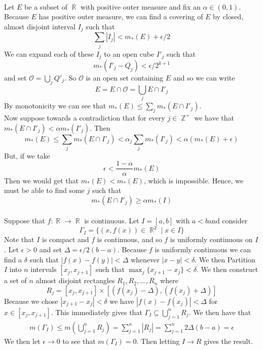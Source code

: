 \documentclass{article}
\DeclareMathOperator{\Z}{\mathbb{Z}}
\DeclareMathOperator{\R}{\mathbb{R}}
\DeclareMathOperator{\suchthat}{\mathrel{|}}
\newcommand{\problem}[1]{\noindent{\textbf{Problem #1}}\\}
\begin{document}
\problem{1.6.28} Let $E$ be a subset of $\R$ with positive outer measure and fix an $\alpha \in (0,1)$. Because $E$ has positive outer measure, we can find a covering of $E$ by closed, almost disjoint interval $I_j$ such that 
\[
\sum_j |I_j| < m_*(E) + \epsilon/2
\]
We can expand each of these $I_j$ to an open cube $I'_j$ such that 
\[
m_*(I'_j - Q_j) < \epsilon/2^{k+1}
\]
and set $\mathcal{O} = \bigcup_j Q'_j$. So $\mathcal{O}$ is an open set containing $E$ and so we can write
\[
E = E \cap \mathcal{O} = \bigcup_j E \cap I'_j 
\] 
By monotonicity we can see that $m_*(E) \leq \sum_j m_*(E\cap I'_j)$. \\
\indent Now suppose towards a contradiction that for every $j \in \Z^+$ we have that $m_*(E \cap I'_j) < \alpha m_*(I'_j)$. Then
\[
m_*(E) \leq \sum_jm_*(E\cap I'_j) < \alpha_j\sum_j m_*(I'_j) < \alpha(m_*(E) + \epsilon)
\] 
But, if we take 
\[
\epsilon < \frac{1-\alpha}{\alpha}m_*(E)
\]
Then we would get that $m_*(E) < m_*(E)$, which is impossible. Hence, we must be able to find some $j$ such that 
\[
m_*(E \cap I'_j) \geq \alpha m_*(I)
\] 
\problem{1.6.37} Suppose that $f:\R \to \R$ is continuous. Let $I = [a,b]$ with $a < b$and consider 
\[
\Gamma_I = \{(x, f(x)) \in \R^2 \suchthat x\in I\}
\] 
Note that $I$ is compact and $f$ is continuous, and so $f$ is uniformly continuous on $I$. Let $\epsilon > 0$ and set $\Delta = \epsilon/2(b-a)$. Because $f$ is uniformly continuous we can find a $\delta$ such that $|f(x) - f(y)| < \Delta$ whenever $|x-y| < \delta$. We then Partition $I$ into $n$ intervals $[x_j, x_{j+1}]$ such that $\max_j\{x_{j+1} - x_j\} < \delta$. We then construct a set of $n$ almost disjoint rectangles $R_1, R_2, \ldots, R_n$ where
\[
R_j = [x_j, x_{j+1}] \times [(f(x_j) - \Delta), (f(x_j) + \Delta)]
\]
Because we chose $|x_{j+1} - x_j| < \delta$ we have $|f(x) - f(x_j)| < \Delta$ for $x \in  [x_j, x_{j+1}]$. This immediately gives that $\Gamma_I \subseteq \bigcup_{j=1}^n R_j$. We then have that 
\begin{align*}
m(\Gamma_I) \leq m\left(\bigcup_{j=1}^n R_j \right) = \sum_{j=1}^n |R_j| = \sum_{j=1}^n2\Delta(b-a) = \epsilon
\end{align*}
We then let $\epsilon \to 0$ to see that $m(\Gamma_I) = 0$. Then letting $I \to R$ gives the result. 
\end{document}
